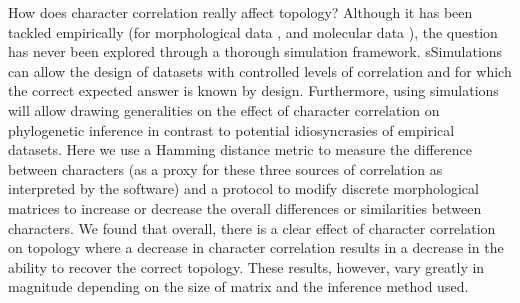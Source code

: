 \documentclass[12pt,letterpaper]{article}
\begin{document}
\noindent How does character correlation really affect topology?
Although it has been tackled empirically (for morphological data \citealt{Davalos01072014}, and molecular data \citealt{ZouConvergence}), the question has never been explored through a thorough simulation framework.
sSimulations can allow the design of datasets with controlled levels of correlation and for which the correct expected answer is known by design.
Furthermore, using simulations will allow drawing generalities on the effect of character correlation on phylogenetic inference in contrast to potential idiosyncrasies of empirical datasets.
Here we use a Hamming distance metric to measure the difference between characters (as a proxy for these three sources of correlation as interpreted by the software) and a protocol to modify discrete morphological matrices to increase or decrease the overall differences or similarities between characters.
We found that overall, there is a clear effect of character correlation on topology where a decrease in character correlation results in a decrease in the ability to recover the correct topology.
These results, however, vary greatly in magnitude depending on the size of matrix and the inference method used.
\end{document}
